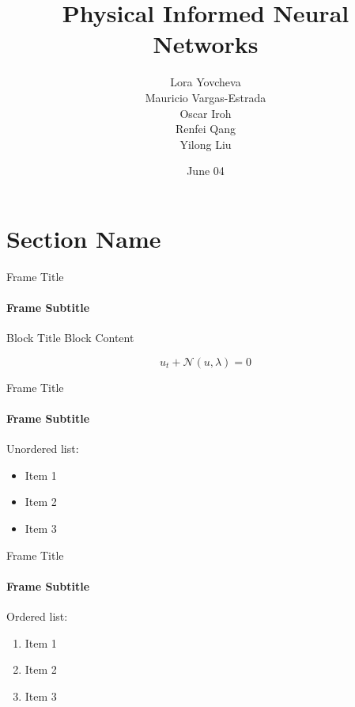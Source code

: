 \documentclass{beamer}
\title{Physical Informed Neural Networks}
\date{June 04}
\author{Lora Yovcheva\\
Mauricio Vargas-Estrada\\
Oscar Iroh\\
Renfei Qang\\
Yilong Liu}
\begin{document}
\insertTitleSlide

\section{Section Name}

\begin{frame}{Frame Title}
\framesubtitle{Frame Subtitle} 
    \begin{block}{Block Title}
        Block Content

        \begin{equation}
            u_t + \mathcal{N}(u, \lambda) = 0
        \end{equation}
    \end{block}
\end{frame}

\begin{frame}{Frame Title}
\framesubtitle{Frame Subtitle} 

Unordered list:

\begin{itemize}
    \item Item 1
    \item Item 2
    \item Item 3
\end{itemize}
\end{frame}

\begin{frame}{Frame Title}
\framesubtitle{Frame Subtitle} 

Ordered list:

\begin{enumerate}
    \item Item 1
    \item Item 2
    \item Item 3
\end{enumerate}

\end{frame}







\insertLastSlide
\end{document}
